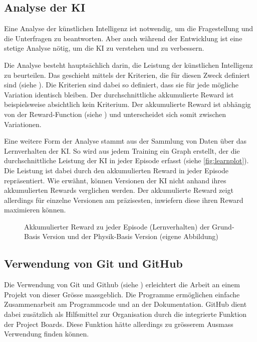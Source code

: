\subsection{Analyse der KI}\label{sub:d_reflex_analys}
Eine Analyse der künstlichen Intelligenz ist notwendig, um die Fragestellung und die
Unterfragen zu beantworten. Aber auch während der Entwicklung ist eine
stetige Analyse nötig, um die KI zu verstehen und zu verbessern.
 
Die Analyse besteht hauptsächlich darin, die Leistung der künstlichen
Intelligenz zu beurteilen. Das geschieht mittels der Kriterien, die für diesen
Zweck definiert sind (siehe ). Die Kriterien sind dabei so
definiert, dass sie für jede mögliche Variation identisch bleiben. Der
durchschnittliche akkumulierte Reward ist beispielsweise absichtlich kein
Kriterium. Der akkumulierte Reward ist abhängig von der Reward-Function (siehe
) und unterscheidet sich somit zwischen Variationen.
 
Eine weitere Form der Analyse stammt aus der Sammlung von Daten über das
Lernverhalten der KI. So wird aus jedem Training ein Graph erstellt, der die
durchschnittliche Leistung der KI in jeder Episode erfasst (siehe
\autoref{fig:learnplot}). Die Leistung ist dabei durch den akkumulierten Reward
in jeder Episode repräsentiert. Wie erwähnt, können Versionen der KI nicht anhand
ihres akkumulierten Rewards verglichen werden. Der akkumulierte Reward zeigt
allerdings für einzelne Versionen am präzisesten, inwiefern diese ihren Reward
maximieren können.

\newpage 
\begin{figure}[!ht]
   \centering
   \caption{Akkumulierter Reward zu jeder Episode (Lernverhalten) der Grund-Basis Version und der Physik-Basis Version (eigene Abbildung)}\label{fig:learnplot}
\end{figure}
 
 
\subsection{Verwendung von Git und GitHub}\label{sub:d_reflex_git} Die
Verwendung von Git und Github (siehe ) erleichtert die
Arbeit an einem Projekt von dieser Grösse massgeblich. Die Programme ermöglichen
einfache Zusammenarbeit am Programmcode und an der Dokumentation. GitHub dient
dabei zusätzlich als Hilfsmittel zur Organisation durch die integrierte Funktion
der Project Boards. Diese Funktion hätte allerdings zu grösserem Ausmass
Verwendung finden können.
 
